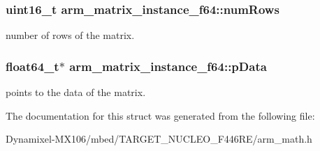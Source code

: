 \subsubsection[{\texorpdfstring{num\+Rows}{numRows}}]{\setlength{\rightskip}{0pt plus 5cm}uint16\+\_\+t arm\+\_\+matrix\+\_\+instance\+\_\+f64\+::num\+Rows}\hypertarget{structarm__matrix__instance__f64_a8b44d1e5003345047c4ead9e1593bf22}{}\label{structarm__matrix__instance__f64_a8b44d1e5003345047c4ead9e1593bf22}
number of rows of the matrix. 
\subsubsection[{\texorpdfstring{p\+Data}{pData}}]{\setlength{\rightskip}{0pt plus 5cm}float64\+\_\+t$\ast$ arm\+\_\+matrix\+\_\+instance\+\_\+f64\+::p\+Data}\hypertarget{structarm__matrix__instance__f64_a5b2475f8ff1e4818955cdd18bc40a097}{}\label{structarm__matrix__instance__f64_a5b2475f8ff1e4818955cdd18bc40a097}
points to the data of the matrix. 

The documentation for this struct was generated from the following file\+:\begin{DoxyCompactItemize}
\item 
Dynamixel-\/\+M\+X106/mbed/\+T\+A\+R\+G\+E\+T\+\_\+\+N\+U\+C\+L\+E\+O\+\_\+\+F446\+R\+E/arm\+\_\+math.\+h\end{DoxyCompactItemize}
